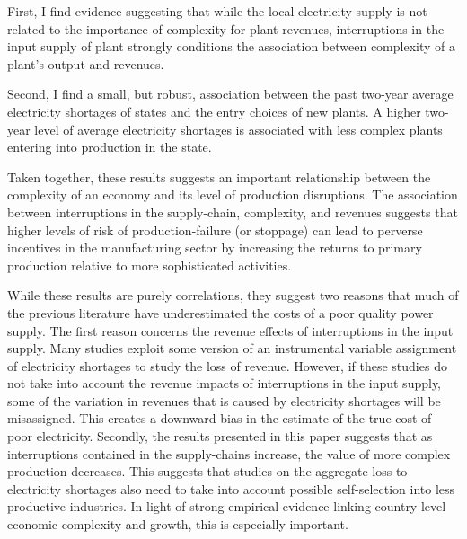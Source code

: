 \documentclass[11pt]{article}
\begin{document}
First, I find evidence suggesting that while the local electricity supply is not related to the importance of complexity for plant revenues, interruptions in the input supply of plant strongly conditions the association between complexity of a plant's output and revenues.

Second, I find a small, but robust, association between the past two-year average electricity shortages of states and the entry choices of new plants. A higher two-year level of average electricity shortages is associated with less complex plants entering into production in the state. 

Taken together, these results suggests an important relationship between the complexity of an economy and its level of production disruptions. The association between interruptions in the supply-chain, complexity, and revenues suggests that higher levels of risk of production-failure (or stoppage) can lead to perverse incentives in the manufacturing sector by increasing the returns to primary production relative to more sophisticated activities. 

While these results are purely correlations, they suggest two reasons that much of the previous literature have underestimated the costs of a poor quality power supply. The first reason concerns the revenue effects of interruptions in the input supply. Many studies exploit some version of an instrumental variable assignment of electricity shortages to study the loss of revenue. However, if these studies do not take into account the revenue impacts of interruptions in the input supply, some of the variation in revenues that is caused by electricity shortages will be misassigned. This creates a downward bias in the estimate of the true cost of poor electricity. Secondly, the results presented in this paper suggests that as interruptions contained in the supply-chains increase, the value of more complex production decreases. This suggests that studies on the aggregate loss to electricity shortages also need to take into account possible self-selection into less productive industries. In light of strong empirical evidence linking country-level economic complexity and growth, this is especially important.






\newpage
\end{document}
